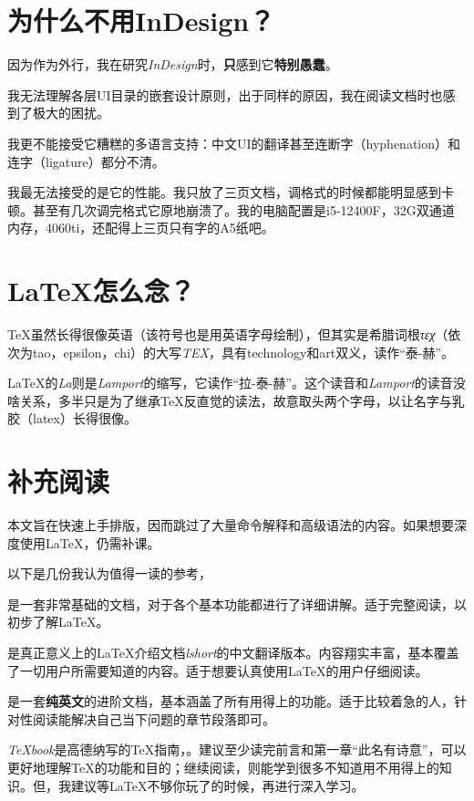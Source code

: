 \documentclass[10pt,openany]{book}
\begin{document}
\begin{sloppypar}
    \section{为什么不用InDesign？}

    因为作为外行，我在研究\emph{InDesign}时，\textbf{只}感到它\textbf{特别愚蠢}。

    我无法理解各层UI目录的嵌套设计原则，出于同样的原因，我在阅读文档时也感到了极大的困扰。

    我更不能接受它糟糕的多语言支持：中文UI的翻译甚至连断字（hyphenation）和连字（ligature）都分不清。

    我最无法接受的是它的性能。我只放了三页文档，调格式的时候都能明显感到卡顿。甚至有几次调完格式它原地崩溃了。我的电脑配置是i5-12400F，32G双通道内存，4060ti，还配得上三页只有字的A5纸吧。

    \section{\texorpdfstring{{\LaTeX}怎么念？}{\textbackslash LaTeX怎么念？}}

     {\TeX}虽然长得很像英语（该符号也是用英语字母绘制），但其实是希腊词根\emph{τεχ}（依次为tao，epsilon，chi）的大写\emph{ΤΕΧ}，具有technology和art双义，读作“泰-赫”。

    {\LaTeX}的\emph{La}则是\emph{Lamport}的缩写，它读作“拉-泰-赫”。这个读音和\emph{Lamport}的读音没啥关系，多半只是为了继承{\TeX}反直觉的读法，故意取头两个字母，以让名字与乳胶（latex）长得很像。

    \section{补充阅读}

    本文旨在快速上手排版，因而跳过了大量命令解释和高级语法的内容。如果想要深度使用{\LaTeX}，仍需补课。

    以下是几份我认为值得一读的参考，

    是一套非常基础的文档，对于各个基本功能都进行了详细讲解。适于完整阅读，以初步了解{\LaTeX}。

    是真正意义上的{\LaTeX}介绍文档\emph{lshort}的中文翻译版本。内容翔实丰富，基本覆盖了一切用户所需要知道的内容。适于想要认真使用{\LaTeX}的用户仔细阅读。

    是一套\textbf{纯英文}的进阶文档，基本涵盖了所有用得上的功能。适于比较着急的人，针对性阅读能解决自己当下问题的章节段落即可。

    \emph{{\TeX}book}是高德纳写的{\TeX}指南，。建议至少读完前言和第一章“此名有诗意”，可以更好地理解{\TeX}的功能和目的；继续阅读，则能学到很多不知道用不用得上的知识。但，我建议等{\LaTeX}不够你玩了的时候，再进行深入学习。

    \thispagestyle{mystyle}

\end{sloppypar}


\end{document}
